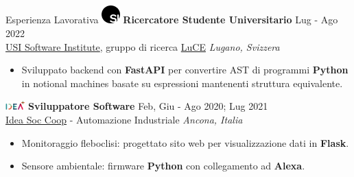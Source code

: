 \documentclass{cv} %
\def\intraexpvspace{0.15cm}
\begin{document}
\begin{minipage}[b][0.9\paperheight][t]{0.7\linewidth}
\begin{rSection}{Esperienza Lavorativa}
        \includegraphics[width=0.7cm, trim={0cm 10cm 0cm 0cm}]{si-icon.jpg}
        \hspace*{0cm}\textbf{Ricercatore Studente Universitario} \hfill Lug - Ago 2022\\
        \hspace*{0.85cm}\href{https://www.si.usi.ch/}{USI Software Institute},
        gruppo di ricerca
        \href{https://luce.si.usi.ch/team/}{LuCE}
        \hfill \textit{Lugano, Svizzera}
        \begin{itemize}
            \item Sviluppato backend con \textbf{FastAPI} per convertire AST di programmi \textbf{Python}
                  in notional machines basate su espressioni mantenenti struttura equivalente.
        \end{itemize}
        \vspace{\intraexpvspace}
        \vspace{\intraexpvspace}

        \includegraphics[width=0.75cm, trim={0cm 1.5cm 0cm 0cm}]{idea-icon.png}
        \textbf{Sviluppatore Software} \hfill Feb, Giu - Ago 2020; Lug 2021\\
        \hspace*{0.85cm}\href{https://idea-on-line.it/}{Idea Soc Coop} - Automazione Industriale
        \hfill \textit{Ancona, Italia}
        \begin{itemize}
            \item Monitoraggio fleboclisi:
                  progettato sito web per visualizzazione dati in \textbf{Flask}.

            \item Sensore ambientale:
                  firmware \textbf{Python} con collegamento ad \textbf{Alexa}.
        \end{itemize}
        \vspace{\intraexpvspace}
        \vspace{\intraexpvspace}


\end{rSection}
\end{minipage}
\end{document}
